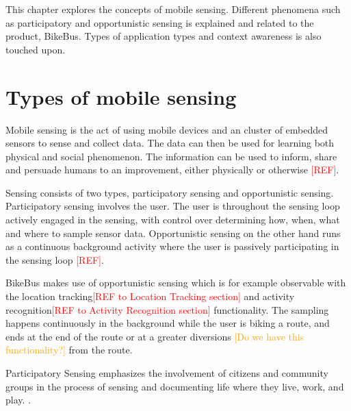 

This chapter explores the concepts of mobile sensing. Different phenomena such as participatory and opportunistic sensing is explained and related to the product, BikeBus. Types of application types and context awareness is also touched upon.

\section{Types of mobile sensing}  
Mobile sensing is the act of using mobile devices and an cluster of embedded sensors to sense and collect data. The data can then be used for learning both physical and social phenomenon. The information can be used to inform, share and persuade humans to an improvement, either physically or otherwise \textcolor{red}{[REF]}. 


Sensing consists of two types, participatory sensing and opportunistic sensing. Participatory sensing involves the user. The user is throughout the sensing loop actively engaged in the sensing, with control over determining how, when, what and where to sample sensor data. Opportunistic sensing on the other hand runs as a continuous background activity where the user is passively participating in the sensing loop \textcolor{red}{[REF]}.

BikeBus makes use of opportunistic sensing which is for example observable with the location tracking\textcolor{red}{[REF to Location Tracking section]} and activity recognition\textcolor{red}{[REF to Activity Recognition section]} functionality. The sampling happens continuously in the background while the user is biking a route, and ends at the end of the route or at a greater diversions \textcolor{orange}{[Do we have this functionality?]} from the route. 

\begin{defi}
Participatory  Sensing  emphasizes  the  involvement  of  citizens  and  community  groups  in  the 
process  of  sensing  and  documenting  life  where  they  live,  work,  and  play. \cite{Goldman2009}. 
\end{defi}

